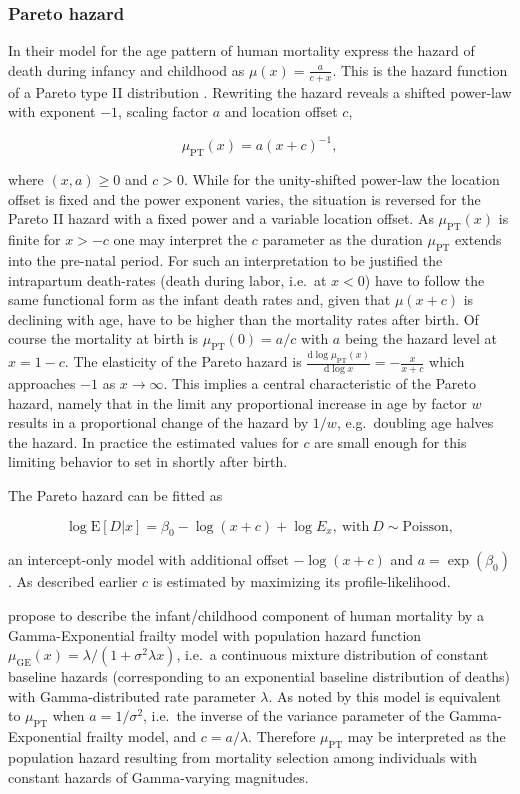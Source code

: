 \documentclass[10pt, twoside, parskip=half]{article}
\begin{document}
\subsubsection*{Pareto hazard}\label{pareto-hazard}

In their model for the age pattern of human mortality \citet{DeBeer2016}
express the hazard of death during infancy and childhood as
\(\mu(x)=\frac{a}{c+x}\). This is the hazard function of a Pareto type
II distribution \citep[pp.~400]{Lomax1954, Marshall2007}. Rewriting the
hazard reveals a shifted power-law with exponent \(-1\), scaling factor
\(a\) and location offset \(c\),

\[
\mu_\text{PT}(x) = a(x+c)^{-1},
\]

where \((x, a)\geq 0\) and \(c > 0\). While for the unity-shifted
power-law the location offset is fixed and the power exponent varies,
the situation is reversed for the Pareto II hazard with a fixed power
and a variable location offset. As \(\mu_\text{PT}(x)\) is finite for
\(x>-c\) one may interpret the \(c\) parameter as the duration
\(\mu_\text{PT}\) extends into the pre-natal period. For such an
interpretation to be justified the intrapartum death-rates (death during
labor, i.e.~at \(x<0\)) have to follow the same functional form as the
infant death rates and, given that \(\mu(x+c)\) is declining with age,
have to be higher than the mortality rates after birth. Of course the
mortality at birth is \(\mu_\text{PT}(0)=a/c\) with \(a\) being the
hazard level at \(x=1-c\). The elasticity of the Pareto hazard is
\(\frac{\text{d}\log\mu_\text{PT}(x)}{\text{d}\log x}=-\frac{x}{x+c}\)
which approaches \(-1\) as \(x\rightarrow\infty\). This implies a
central characteristic of the Pareto hazard, namely that in the limit
any proportional increase in age by factor \(w\) results in a
proportional change of the hazard by \(1/w\), e.g.~doubling age halves
the hazard. In practice the estimated values for \(c\) are small enough
for this limiting behavior to set in shortly after birth.

The Pareto hazard can be fitted as

\[
\log\text{E}[D|x] = \beta_0 - \log(x+c) + \log E_x,~\text{with}~D\sim\text{Poisson},
\]

an intercept-only model with additional offset \(-\log(x+c)\) and
\(a=\exp(\beta_0)\). As described earlier \(c\) is estimated by
maximizing its profile-likelihood.

\citet{Vaupel1983} propose to describe the infant/childhood component of
human mortality by a Gamma-Exponential frailty model with population
hazard function \(\mu_\text{GE}(x)=\lambda/(1+\sigma^2\lambda x)\),
i.e.~a continuous mixture distribution of constant baseline hazards
(corresponding to an exponential baseline distribution of deaths) with
Gamma-distributed rate parameter \(\lambda\). As noted by
\citet{Wienke2011} this model is equivalent to \(\mu_\text{PT}\) when
\(a=1/\sigma^2\), i.e.~the inverse of the variance parameter of the
Gamma-Exponential frailty model, and \(c = a/\lambda\). Therefore
\(\mu_\text{PT}\) may be interpreted as the population hazard resulting
from mortality selection among individuals with constant hazards of
Gamma-varying magnitudes.
\end{document}
